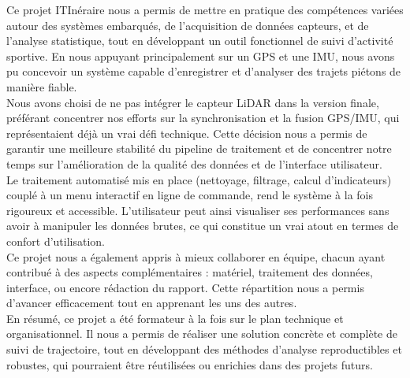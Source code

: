 Ce projet ITInéraire nous a permis de mettre en pratique des compétences variées autour des systèmes embarqués, de l’acquisition de données capteurs, et de l’analyse statistique, tout en développant un outil fonctionnel de suivi d’activité sportive. En nous appuyant principalement sur un GPS et une IMU, nous avons pu concevoir un système capable d’enregistrer et d’analyser des trajets piétons de manière fiable.\\

Nous avons choisi de ne pas intégrer le capteur LiDAR dans la version finale, préférant concentrer nos efforts sur la synchronisation et la fusion GPS/IMU, qui représentaient déjà un vrai défi technique. Cette décision nous a permis de garantir une meilleure stabilité du pipeline de traitement et de concentrer notre temps sur l’amélioration de la qualité des données et de l’interface utilisateur.\\

Le traitement automatisé mis en place (nettoyage, filtrage, calcul d’indicateurs) couplé à un menu interactif en ligne de commande, rend le système à la fois rigoureux et accessible. L’utilisateur peut ainsi visualiser ses performances sans avoir à manipuler les données brutes, ce qui constitue un vrai atout en termes de confort d’utilisation.\\

Ce projet nous a également appris à mieux collaborer en équipe, chacun ayant contribué à des aspects complémentaires : matériel, traitement des données, interface, ou encore rédaction du rapport. Cette répartition nous a permis d'avancer efficacement tout en apprenant les uns des autres.\\

En résumé, ce projet a été formateur à la fois sur le plan technique et organisationnel. Il nous a permis de réaliser une solution concrète et complète de suivi de trajectoire, tout en développant des méthodes d’analyse reproductibles et robustes, qui pourraient être réutilisées ou enrichies dans des projets futurs.\\

